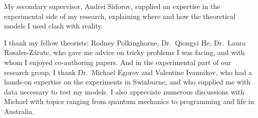 My secondary supervisor, Andrei Sidorov, supplied an expertise in the experimental side of my research, explaining where and how the theoretical models I used clash with reality.

I thank my fellow theorists: Rodney Polkinghorne, Dr.~Qiongyi He, Dr.~Laura Rosales-Z\'arate, who gave me advice on tricky problems I was facing, and with whom I enjoyed co-authoring papers.
And in the experimental part of our research group, I thank Dr.~Michael Egorov and Valentine Ivannikov, who had a hands-on expertise on the  experiments in Swinburne, and who supplied me with data necessary to test my models. I also appreciate numerous discussions with Michael with topics ranging from quantum mechanics to programming and life in Australia.
